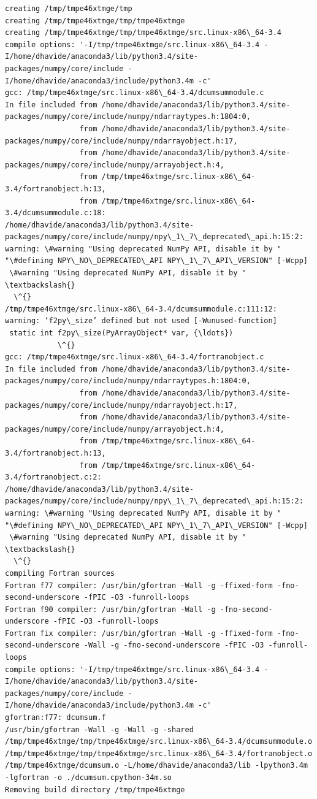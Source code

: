 \documentclass{article}
\begin{document}
\begin{Verbatim}[commandchars=\\\{\}]
creating /tmp/tmpe46xtmge/tmp
creating /tmp/tmpe46xtmge/tmp/tmpe46xtmge
creating /tmp/tmpe46xtmge/tmp/tmpe46xtmge/src.linux-x86\_64-3.4
compile options: '-I/tmp/tmpe46xtmge/src.linux-x86\_64-3.4 -I/home/dhavide/anaconda3/lib/python3.4/site-packages/numpy/core/include -I/home/dhavide/anaconda3/include/python3.4m -c'
gcc: /tmp/tmpe46xtmge/src.linux-x86\_64-3.4/dcumsummodule.c
In file included from /home/dhavide/anaconda3/lib/python3.4/site-packages/numpy/core/include/numpy/ndarraytypes.h:1804:0,
                 from /home/dhavide/anaconda3/lib/python3.4/site-packages/numpy/core/include/numpy/ndarrayobject.h:17,
                 from /home/dhavide/anaconda3/lib/python3.4/site-packages/numpy/core/include/numpy/arrayobject.h:4,
                 from /tmp/tmpe46xtmge/src.linux-x86\_64-3.4/fortranobject.h:13,
                 from /tmp/tmpe46xtmge/src.linux-x86\_64-3.4/dcumsummodule.c:18:
/home/dhavide/anaconda3/lib/python3.4/site-packages/numpy/core/include/numpy/npy\_1\_7\_deprecated\_api.h:15:2: warning: \#warning "Using deprecated NumPy API, disable it by " "\#defining NPY\_NO\_DEPRECATED\_API NPY\_1\_7\_API\_VERSION" [-Wcpp]
 \#warning "Using deprecated NumPy API, disable it by " \textbackslash{}
  \^{}
/tmp/tmpe46xtmge/src.linux-x86\_64-3.4/dcumsummodule.c:111:12: warning: ‘f2py\_size’ defined but not used [-Wunused-function]
 static int f2py\_size(PyArrayObject* var, {\ldots})
            \^{}
gcc: /tmp/tmpe46xtmge/src.linux-x86\_64-3.4/fortranobject.c
In file included from /home/dhavide/anaconda3/lib/python3.4/site-packages/numpy/core/include/numpy/ndarraytypes.h:1804:0,
                 from /home/dhavide/anaconda3/lib/python3.4/site-packages/numpy/core/include/numpy/ndarrayobject.h:17,
                 from /home/dhavide/anaconda3/lib/python3.4/site-packages/numpy/core/include/numpy/arrayobject.h:4,
                 from /tmp/tmpe46xtmge/src.linux-x86\_64-3.4/fortranobject.h:13,
                 from /tmp/tmpe46xtmge/src.linux-x86\_64-3.4/fortranobject.c:2:
/home/dhavide/anaconda3/lib/python3.4/site-packages/numpy/core/include/numpy/npy\_1\_7\_deprecated\_api.h:15:2: warning: \#warning "Using deprecated NumPy API, disable it by " "\#defining NPY\_NO\_DEPRECATED\_API NPY\_1\_7\_API\_VERSION" [-Wcpp]
 \#warning "Using deprecated NumPy API, disable it by " \textbackslash{}
  \^{}
compiling Fortran sources
Fortran f77 compiler: /usr/bin/gfortran -Wall -g -ffixed-form -fno-second-underscore -fPIC -O3 -funroll-loops
Fortran f90 compiler: /usr/bin/gfortran -Wall -g -fno-second-underscore -fPIC -O3 -funroll-loops
Fortran fix compiler: /usr/bin/gfortran -Wall -g -ffixed-form -fno-second-underscore -Wall -g -fno-second-underscore -fPIC -O3 -funroll-loops
compile options: '-I/tmp/tmpe46xtmge/src.linux-x86\_64-3.4 -I/home/dhavide/anaconda3/lib/python3.4/site-packages/numpy/core/include -I/home/dhavide/anaconda3/include/python3.4m -c'
gfortran:f77: dcumsum.f
/usr/bin/gfortran -Wall -g -Wall -g -shared /tmp/tmpe46xtmge/tmp/tmpe46xtmge/src.linux-x86\_64-3.4/dcumsummodule.o /tmp/tmpe46xtmge/tmp/tmpe46xtmge/src.linux-x86\_64-3.4/fortranobject.o /tmp/tmpe46xtmge/dcumsum.o -L/home/dhavide/anaconda3/lib -lpython3.4m -lgfortran -o ./dcumsum.cpython-34m.so
Removing build directory /tmp/tmpe46xtmge
    \end{Verbatim}
\end{document}

